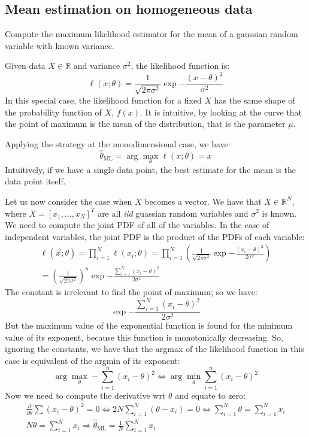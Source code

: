 \subsection{Mean estimation on homogeneous data}
\begin{exercise}
    Compute the maximum likelihood estimator for the mean of a gaussian random variable with known variance.
\end{exercise}
Given data $X \in \mathbb{R}$ and variance $\sigma^2$, the likelihood function is:
\[
    \ell(x;\theta) = \frac{1}{\sqrt{2\pi\sigma^2}} \exp{-\frac{(x-\theta)^2}{\sigma^2}}
\]
In this special case, the likelihood function for a fixed $X$ has the same shape of the probability function of $X$, $f(x)$.
It is intuitive, by looking at the curve that the point of maximum is the mean of the distribution, that is the parameter $\mu$.

Applying the strategy at the monodimensional case, we have:
\[
    \hat{\theta}_{\text{ML}} = \arg\max_{\theta} \ell(x; \theta) = x
\]
Intuitively, if we have a single data point, the best estimate for the mean is the data point itself.

Let us now consider the case when $X$ becomes a vector. We have that $X \in \mathbb{R}^N$, where
$X = \left[x_1, \dots, x_N\right]^T$ are all \textit{iid} guassian random variables and $\sigma^2$ is known. We need to compute the joint PDF of all of the variables. In the case of independent variables, the joint PDF is the product of the PDFs of each variable:
\begin{align*}
    \ell(\vec{x};\theta) = \prod_{i=1}^{N} \ell(x_i;\theta) = \prod_{i=1}^{N} \left(\frac{1}{\sqrt{2\pi\sigma^2}} \exp{-\frac{(x_i - \theta)^2}{2\sigma^2}}\right) \\
    = \left(\frac{1}{\sqrt{2\pi\sigma^2}}\right)^n \exp{-\frac{\sum_{i=1}^{N} (x_i - \theta)^2}{2\sigma^2}}
\end{align*}
The constant is irrelevant to find the point of maximum; so we have:
\[
    \exp{-\frac{\sum_{i=1}^{N} (x_i - \theta)^2}{2\sigma^2}}
\]
But the maximum value of the exponential function is found for the minimum value of its exponent, because this function is monotonically decreasing. So, ignoring the constants, we have that the argmax of the likelihood function in this case is equivalent of the argmin of its exponent:
\[
    \arg\max_{\theta} - \sum_{i = 1}^{n} {(x_i - \theta)^2} \Leftrightarrow \arg\min_{\theta} \sum_{i = 1}^{n} {(x_i - \theta)^2}
\]
Now we need to compute the derivative wrt $\theta$ and equate to zero:
\begin{gather*}
    \frac{\partial }{\partial \theta}\sum(x_i-\theta)^2 = 0 \Leftrightarrow 2N\sum_{i=1}^N(\theta - x_i) = 0 \Leftrightarrow \sum_{i=1}^N \theta = \sum_{i=1}^N x_i \\
    N\theta = \sum_{i=1}^N x_i \Rightarrow \hat{\theta}_{\text{ML}}  = \frac{1}{N}\sum_{i=1}^N x_i
\end{gather*}

